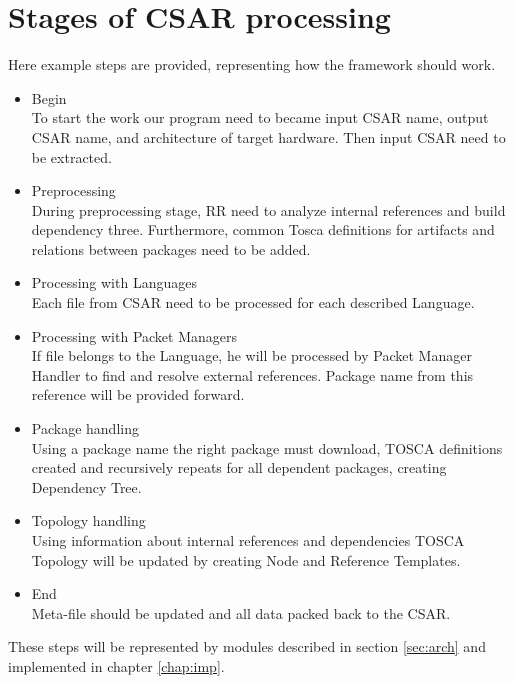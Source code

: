 \section*{Stages of CSAR processing}
Here example steps are provided, representing how the framework should work.
\begin{itemize}  
	\item Begin  \\
	To start the work our program need to became input CSAR name, output CSAR name, and architecture of target hardware. 
	Then input CSAR need to be extracted.
	\item Preprocessing\\
	During preprocessing stage, RR need to analyze internal references and build dependency three.
	Furthermore, common Tosca definitions for artifacts and  relations between packages need to be added.
	\item Processing with Languages\\
	Each file from CSAR need to be processed for each described Language.
	\item Processing with Packet Managers\\
    If file belongs to the Language, he will be processed by Packet Manager Handler to find and resolve external references.
    Package name from this reference will be provided forward.
	\item Package handling\\
	Using a package name the right package must download, TOSCA definitions created and recursively repeats for all dependent packages, creating Dependency Tree.
	\item Topology handling\\
	Using information about internal references and dependencies TOSCA Topology will be updated by creating Node and Reference Templates. 
	\item End\\
	Meta-file should be updated and all data packed back to the CSAR.
\end{itemize}
These steps will be represented by modules described in section \ref{sec:arch} and implemented in chapter \ref{chap:imp}.